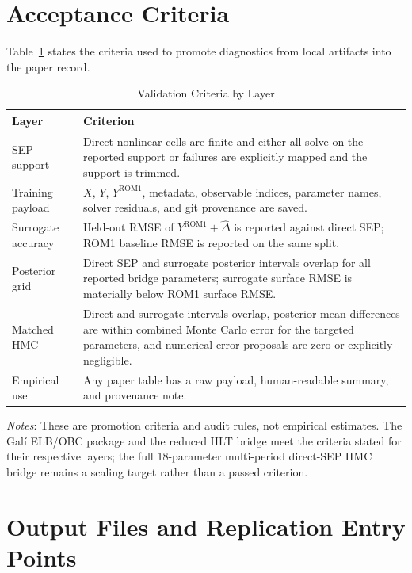 \documentclass[12pt]{article}
\newcommand{\rom}{\mathrm{ROM1}}
\newcommand{\techappendixnotes}[1]{%
  \par\smallskip
  \noindent\begin{minipage}{0.92\textwidth}%
  \footnotesize #1%
  \end{minipage}\par%
}
\begin{document}
\section{Acceptance Criteria}
\label{apptech:criteria}

Table~\ref{tab:tech_validation_criteria} states the criteria used to promote
diagnostics from local artifacts into the paper record.

\begin{table}[htbp]
\centering
\caption{Validation Criteria by Layer}
\label{tab:tech_validation_criteria}
\begin{tabular}{p{}p{}}
\toprule
Layer & Criterion \\
\midrule
SEP support & Direct nonlinear cells are finite and either all solve on the
reported support or failures are explicitly mapped and the support is trimmed. \\
Training payload & \(X\), \(Y\), \(Y^{\rom}\), metadata, observable indices,
parameter names, solver residuals, and git provenance are saved. \\
Surrogate accuracy & Held-out RMSE of \(Y^{\rom}+\widehat{\Delta}\) is reported
against direct SEP; ROM1 baseline RMSE is reported on the same split. \\
Posterior grid & Direct SEP and surrogate posterior intervals overlap for all
reported bridge parameters; surrogate surface RMSE is materially below ROM1
surface RMSE. \\
Matched HMC & Direct and surrogate intervals overlap, posterior mean
differences are within combined Monte Carlo error for the targeted parameters,
and numerical-error proposals are zero or explicitly negligible. \\
Empirical use & Any paper table has a raw payload, human-readable summary, and
provenance note. \\
\bottomrule
\end{tabular}
\techappendixnotes{\textit{Notes}: These are promotion criteria and audit
rules, not empirical estimates. The Gal\'i ELB/OBC package and the reduced HLT
bridge meet the criteria stated for their respective layers; the full
18-parameter multi-period direct-SEP HMC bridge remains a scaling target rather
than a passed criterion.}
\end{table}

\section{Output Files and Replication Entry Points}
\label{apptech:outputs}
\end{document}
